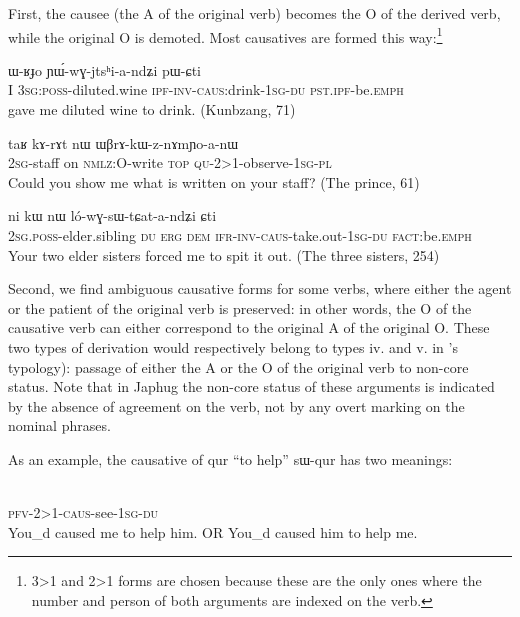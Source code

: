 \documentclass[oldfontcommands,oneside,a4paper,11pt]{article}
\newcommand{\ipa}[1]{{\phon \mbox{#1}}} %
\newcommand{\sg}{\textsc{sg}}
\newcommand{\pl}{\textsc{pl}}
\newcommand{\wav}[1]{}%
\newcommand{\pfv}{\textsc{pfv}}
\newcommand{\caus}{\textsc{caus}}
\newcommand{\dem}{\textsc{dem}}
\newcommand{\du}{\textsc{du}}
\newcommand{\erg}{\textsc{erg}}
\newcommand{\emphat}{\textsc{emph}}
\newcommand{\evd}{\textsc{ifr}}
\newcommand{\inv}{\textsc{inv}}
\newcommand{\ipf}{\textsc{ipf}}
\newcommand{\nmlz}{\textsc{nmlz}}
\newcommand{\fact}{\textsc{fact}}
\newcommand{\poss}{\textsc{poss}}
\newcommand{\pst}{\textsc{pst}}
\newcommand{\qu}{\textsc{qu}}
\newcommand{\topic}{\textsc{top}}
\begin{document}
First, the causee (the A of the original verb) becomes the O of the derived verb, while the original O is demoted. Most causatives are formed this way:\footnote{3>1 and 2>1 forms are chosen because these are the only ones where the number and person of both arguments are indexed on the verb.}
 \begin{exe}
\ex
\gll  \ipa{aʑo} 	\ipa{ɯ-ʁɟo} 	\ipa{ɲɯ́-wɣ-jtsʰi-a-ndʑi} 	\ipa{pɯ-ɕti}  \\
  I 3\sg{}:\poss{}-diluted.wine \ipf{}-\inv{}-\caus{}:drink-1\sg{}-\du{} \pst{}.\ipf{}-be.\emphat{} \\
   gave me diluted wine to drink. (Kunbzang, 71)
\end{exe} 
 
 \begin{exe}
\ex
\gll  \ipa{nɤ-tɤɲi} 	\ipa{taʁ} 	\ipa{kɤ-rɤt} 	\ipa{nɯ} 	\ipa{ɯβrɤ-kɯ-z-nɤmɲo-a-nɯ} \\
  2\sg{}-staff on \nmlz{}:O-write \topic{} \qu{}-2>1-observe-1\sg{}-\pl{} \\
  \glt Could you show me what is written on your staff? (The prince, 61)
\end{exe} 

 \begin{exe}
\ex
\gll \ipa{nɤ-pi} 	\ipa{ni} 	\ipa{kɯ} 	\ipa{nɯ} 	\ipa{ló-wɣ-sɯ-tɕat-a-ndʑi} 	\ipa{ɕti}  \\
2\sg{}.\poss{}-elder.sibling \du{} \erg{} \dem{} \evd{}-\inv{}-\caus{}-take.out-1\sg{}-\du{} \fact{}:be.\emphat{} \\
  \glt Your two elder sisters forced me to spit it out. (The three sisters, 254)
\end{exe} 

Second, we find ambiguous causative forms for some verbs, where either the agent or the patient of the original verb is preserved: in other words, the O of the causative verb can either correspond to the original A of the original O. These two types of derivation would respectively belong to types iv. and v. in \citet[48]{dixon00causative}'s typology): passage of either the A or the O of the original verb to non-core status. Note that in Japhug the non-core status of these arguments is indicated by the absence of agreement on the verb, not by any overt marking on the nominal phrases. 
 
As an example, the causative of \ipa{qur} ``to help''  \ipa{sɯ-qur} has two meanings:

\begin{exe} 
\ex \label{ex:caus:help.2>3>1}
\gll   \ipa{tɤ-kɯ-sɯ-qur-a-ndʑi}  \\
 \pfv{}-2>1-\caus{}-see-1\sg{}-\du{}  \\
 \glt  You_d caused me to help him. OR You_d caused him to help me. \wav{8_tAkWsWqura}
\end{exe} 
\end{document}
